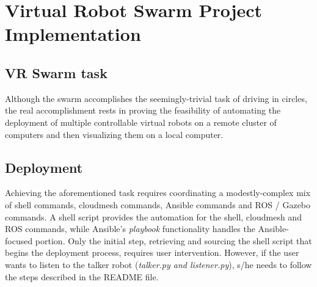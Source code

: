 \documentclass[9pt,twocolumn,twoside]{../../styles/osajnl}
\begin{document}
\section{Virtual Robot Swarm Project Implementation}
\subsection{VR Swarm task}

Although the swarm accomplishes the seemingly-trivial task of driving in circles, the real accomplishment rests in proving the feasibility of automating the deployment of multiple controllable virtual robots on a remote cluster of computers and then visualizing them on a local computer.

\subsection{Deployment}
Achieving the aforementioned task requires coordinating a modestly-complex mix of shell commands, cloudmesh commands, Ansible commands and ROS / Gazebo commands. A shell script provides the automation for the shell, cloudmesh and ROS commands, while Ansible's \textit{playbook} functionality handles the Ansible-focused portion.  Only the initial step, retrieving and sourcing the shell script that begins the deployment process, requires user intervention.  However, if the user wants to listen to the talker robot (\textit{talker.py and listener.py}), s/he needs to follow the steps described in the README file.
\end{document}
